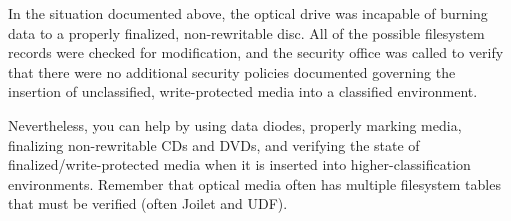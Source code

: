 In the situation documented above, the optical drive was incapable of burning data to a properly finalized, non-rewritable disc. All of the possible filesystem records were checked for modification, and the security office was called to verify that there were no additional security policies documented governing the insertion of unclassified, write-protected media into a classified environment.

Nevertheless, you can help by using data diodes, properly marking media, finalizing non-rewritable CDs and DVDs, and verifying the state of finalized/write-protected media when it is inserted into higher-classification environments. Remember that optical media often has multiple filesystem tables that must be verified (often Joilet and UDF).
